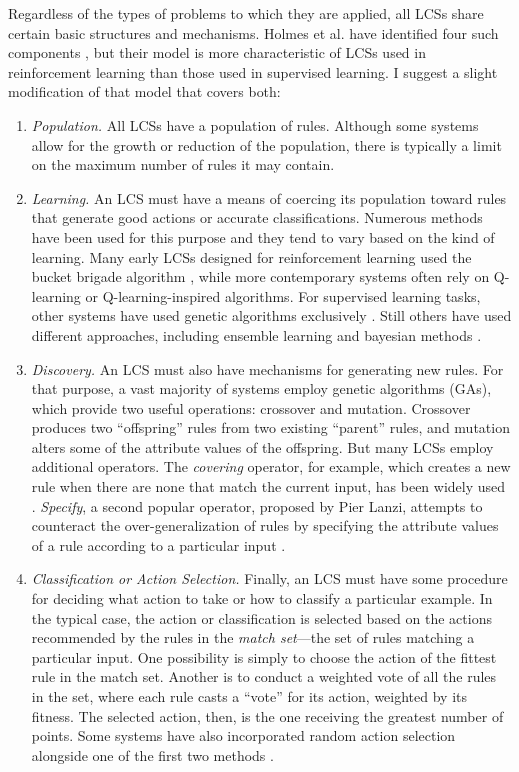 \documentclass[11pt]{article}
\begin{document}
Regardless of the types of problems to which they are applied, all LCSs share certain basic structures and mechanisms. Holmes et al. have identified four such components  \cite{holmes_learning_2002}, but their model is more characteristic of LCSs used in reinforcement learning than those used in supervised learning. I suggest a slight modification of that model that covers both:
\begin{enumerate}
\item \emph{Population.} All LCSs have a population of rules. Although some systems allow for the growth or reduction of the population, there is typically a limit on the maximum number of rules it may contain.
\item \emph{Learning.} An LCS must have a means of coercing its population toward rules that generate good actions or accurate classifications. Numerous methods have been used for this purpose and they tend to vary based on the kind of learning. Many early LCSs designed for reinforcement learning used the bucket brigade algorithm \cite{holland_properties_1985}, while more contemporary systems often rely on Q-learning \cite{c._j._c._h._learning_1989, orriols-puig_fuzzy-ucs:_2009} or Q-learning-inspired algorithms. For supervised learning tasks, other systems have used genetic algorithms exclusively \cite{llora_towards_2007}. Still others have used different approaches, including ensemble learning \cite{gao_learning_2005} and bayesian methods \cite{hai_h._dam_bcs:_2006}.
\item \emph{Discovery.} An LCS must also have mechanisms for generating new rules. For that purpose, a vast majority of systems employ genetic algorithms (GAs), which provide two useful operations: crossover and mutation. Crossover produces two ``offspring'' rules from two existing ``parent'' rules, and mutation alters some of the attribute values of the offspring. But many LCSs employ additional operators. The \emph{covering} operator, for example, which creates a new rule when there are none that match the current input, has been widely used \cite{orriols-puig_fuzzy-ucs:_2009, wilson_classifier_1995, bernado-mansilla_accuracy-based_2003}. \emph{Specify}, a second popular operator, proposed by Pier Lanzi,  attempts to counteract the over-generalization of rules by specifying the attribute values of a rule according to a particular input \cite{lanzi_study_1997}. 
\item \emph{Classification or Action Selection.} Finally, an LCS must have some procedure for deciding what action to take or how to classify a particular example. In the typical case, the action or classification is selected based on the actions recommended by the rules in the \emph{match set}---the set of rules matching a particular input. One possibility is simply to choose the action of the fittest rule in the match set. Another is to conduct a weighted vote of all the rules in the set, where each rule casts a ``vote'' for its action, weighted by its fitness. The selected action, then, is the one receiving the greatest number of points. Some systems have also incorporated random action selection alongside one of the first two methods \cite{wilson_classifier_1995}.
\end{enumerate}
\end{document}
